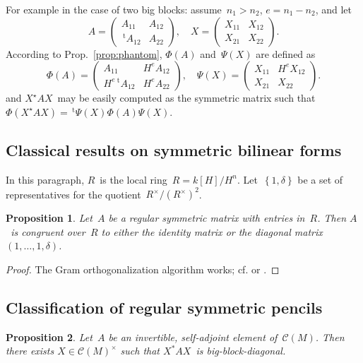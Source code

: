 \documentclass{article}%
\newtheorem{prop}{Proposition}
\let\ro\mathscr
\def\transpose{\,{}^{\mathrm{t}\!}}
\def\acco#1{\left\{#1\right\}}
\def\mat#1{\begin{pmatrix}#1\end{pmatrix}}
\begin{document}
For example in the case of two big blocks: assume~$n_1 > n_2$, $e = n_1 -
n_2$, and let
\[ A = \mat{A_{11} & A_{12}\\ \transpose{A_{12}} & A_{22}}, \quad
X = \mat{X_{11} & X_{12}\\ X_{21} & X_{22}}. \]
According to Prop.~\ref{prop:phantom}, $Φ(A)$ and~$Ψ(X)$ are defined as
\[ Φ(A) = \mat{A_{11} & H^e A_{12}\\ H^e \transpose{A_{12}} & H^e A_{22}},
\quad
Ψ(X) = \mat{X_{11} & H^e X_{12}\\ X_{21} & X_{22}}. \]
and $X^{⋆} A X$~may be easily computed as the symmetric matrix such
that~$Φ(X^{⋆}AX) = \transpose{Ψ(X)} Φ(A) Ψ(X)$.

\subsection{Classical results on symmetric bilinear forms}%

In this paragraph, $R$~is the local ring~$R = k[H]/H^n$.
Let~$\acco{1, δ}$ be a set of representatives for the
quotient~$R^{×}/(R^{×})^2$.

\begin{prop}\label{prop:local-diag}
Let~$A$ be a regular symmetric matrix with entries in~$R$. Then $A$~is
congruent over~$R$ to either the identity matrix or the diagonal
matrix~$(1, …, 1, δ)$.
\end{prop}

\begin{proof}
The Gram orthogonalization algorithm works; cf.
\cite[I(3.4)]{milnorhusemoller} or \cite[92:1]{omeara}.
\end{proof}

\subsection{Classification of regular symmetric pencils}%


\begin{prop}\label{prop:bb-diag}
Let~$A$ be an invertible, self-adjoint element of~$\ro C(M)$. Then there
exists $X ∈ \ro C(M)^{×}$ such that $X^{*} A X$~is big-block-diagonal.
\end{prop}
\end{document}
